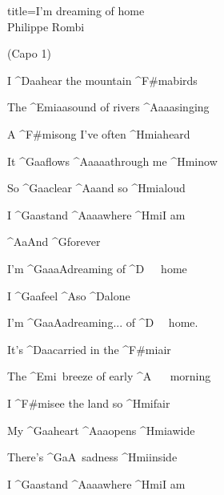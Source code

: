 \begin{song}{title=\predtitle\centering I'm dreaming of home \\\large Philippe Rombi \vspace*{-0.3cm}}  %
\begin{centerjustified}
\nejvetsi

\begin{varwidth}[t]{0.57\textwidth}\setlength{\parindent}{0.45cm}  %

(Capo 1)


\sloka
	I ^{D{\color{white}aa}}hear the mountain  ^{F#m{\color{white}a}}birds

	The ^{Emi{\color{white}aa}}sound of rivers ^{A{\color{white}aaa}}singing

	A ^{F#mi}song I've often  ^{Hmi{\color{white}a}}heard

	It ^{G{\color{white}aa}}flows ^{A{\color{white}aaaa}}through me ^{Hmi}now

	So ^{G{\color{white}aa}}clear ^{A{\color{white}a}}and so ^{Hmi{\color{white}a}}loud

	I ^{G{\color{white}aa}}stand  ^{A{\color{white}aaa}}where ^{Hmi}I am

	^{A{\color{white}a}}And ^{G}forever

	I'm ^{G{\color{white}aaa}A}dreaming of ^{D\,\,\,\,\,\,\,\,\,}home

	I ^{G{\color{white}aa}}feel ^{A}so ^{D}alone

	I'm ^{G{\color{white}aa}A{\color{white}a}}dreaming... of ^{D\,\,\,\,\,\,\,\,}home.

\sloka
	It's ^{D{\color{white}aa}}carried in the  ^{F#mi}air

	The ^{Emi\,\,\,}breeze of early ^{A\,\,\,\,\,\,\,\,\,\,}morning

	I  ^{F#mi}see the land so ^{Hmi}fair

	My ^{G{\color{white}aa}}heart  ^{A{\color{white}aa}}opens  ^{Hmi{\color{white}a}}wide

	There's ^{G{\color{white}a}A\,\,\,}sadness ^{Hmi}inside

\end{varwidth}\mezisloupci\begin{varwidth}[t]{0.55\textwidth}\setlength{\parindent}{0.45cm}
\vspace*{0.4525cm}  %

	I ^{G{\color{white}aa}}stand  ^{A{\color{white}aaa}}where ^{Hmi}I am


\end{varwidth}
\end{centerjustified}
\end{song}
